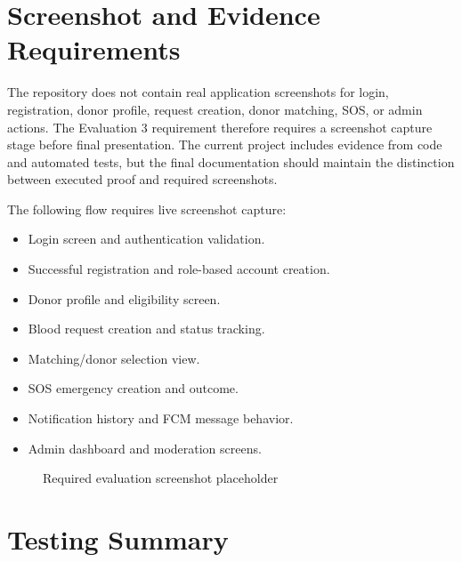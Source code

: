 
\section{Screenshot and Evidence Requirements}

The repository does not contain real application screenshots for login, registration, donor profile, request creation, donor matching, SOS, or admin actions. The Evaluation 3 requirement therefore requires a screenshot capture stage before final presentation. The current project includes evidence from code and automated tests, but the final documentation should maintain the distinction between executed proof and required screenshots.

The following flow requires live screenshot capture:

\begin{itemize}
    \item Login screen and authentication validation.
    \item Successful registration and role-based account creation.
    \item Donor profile and eligibility screen.
    \item Blood request creation and status tracking.
    \item Matching/donor selection view.
    \item SOS emergency creation and outcome.
    \item Notification history and FCM message behavior.
    \item Admin dashboard and moderation screens.
\end{itemize}

\begin{figure}[H]
\centering
{}
\caption{Required evaluation screenshot placeholder}
\end{figure}


\section{Testing Summary}

